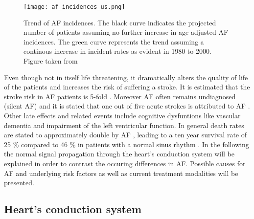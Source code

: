 \documentclass[type=dr, dr=rernat, accentcolor=tud7b,colorbacktitle, bigchapter, openright, twoside, 12pt ]{tudthesis}
\begin{document}
\begin{figure}[H]
\begin{center}
\texttt{[image: af\_incidences\_us.png]}
\caption{Trend of AF incidences. The black curve indicates the projected number of patients assuming no further increase in age-adjusted AF 
incidences. The green curve represents the trend assuming a continous increase in incident rates as evident in 1980 to 2000. Figure taken 
from \cite{Miy06}}
\label{USincidences}
\end{center}
\end{figure}

Even though not in itself life threatening, it dramatically alters the quality of life of the patients and increases the risk of suffering 
a stroke. It is estimated that the stroke risk in AF patients is 5-fold \cite{Ben98} \cite{Wol91}. Moreover AF often remains undiagnosed 
(silent AF) and it is stated that one out of five acute strokes is attributed to AF \cite{ESC10}. Other late effects and related events 
include cognitive dysfuntions like vascular dementia and impairment of the left ventricular function. In general death rates are stated to 
approximately double by AF \cite{ESC10}, leading to a ten year survival rate of 25 \% compared to 46 \% in patients with a normal sinus 
rhythm \cite{ACC06}.\newline
\newline
In the following the normal signal propagation through the heart's conduction system will be explained in order to contrast the occuring 
differences in AF. Possible causes for AF and underlying risk factors as well as current treatment modalities will be presented.

\newpage

\subsection{Heart's conduction system}
\end{document}
